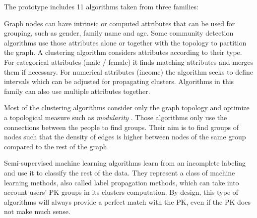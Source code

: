 The prototype includes 11 algorithms taken from three families:
\begin{description}[leftmargin=0pt,nosep]
\item[Attribute based algorithms.] Graph nodes can have intrinsic or computed attributes that can be used for grouping, such as gender, family name and age. Some community detection algorithms use those attributes alone or together with the topology to partition the graph.
A clustering algorithm considers attributes according to their type. For categorical attributes (\eg male / female) it finds matching attributes and merges them if necessary. For numerical attributes (\eg income) the algorithm seeks to define intervals which can be adjusted for propagating clusters.
Algorithms in this family can also use multiple attributes together.

\item[Topology based algorithms.] Most of the clustering algorithms consider only the graph topology and optimize a topological measure such as \emph{modularity} \cite{brandesModularityClustering2008}.
Those algorithms only use the connections between the people to find groups.
Their aim is to find groups of nodes such that the density of edges is higher between nodes of the same group compared to the rest of the graph.

\item[Propagation / Learning based algorithms.] Semi-supervised machine learning algorithms learn from an incomplete labeling and use it to classify the rest of the data. They represent a class of machine learning methods, also called label propagation methods, which can take into account users' PK groups in its clusters computation.
By design, this type of algorithms will always provide a perfect match with the PK, even if the PK does not make much sense.

\end{description}


